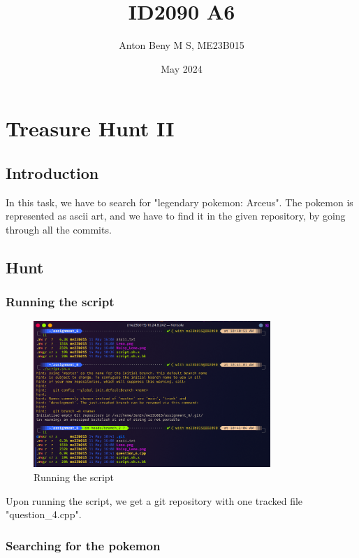 \documentclass[12pt]{report}
\title{ID2090 A6}
\author{Anton Beny M S, ME23B015}
\date{May 2024}
\begin{document}
\maketitle
\newpage

\tableofcontents

\newpage

\chapter{Treasure Hunt II}

\section{Introduction}
In this task, we have to search for "legendary pokemon: Arceus". The pokemon is represented as ascii art, and we have to find it in the given repository, by going through all the commits.

\section{Hunt}

\subsection{Running the script}

\begin{figure}[H]
    \centering
    \includegraphics[width=0.8\textwidth]{1_2_0.png}
    \caption{Running the script}
\end{figure}

Upon running the script, we get a git repository with one tracked file "question\_4.cpp".

\subsection{Searching for the pokemon}
\end{document}
